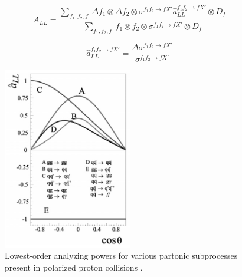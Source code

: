 \begin{equation}
  A_{LL} = \frac{\sum_{f_1,f_2,f}~\Delta f_1 \otimes \Delta f_2 \otimes \sigma^{f_1 f_2 \rightarrow f X'} \hat a_{LL}^{f_1 f_2 \rightarrow f X'} \otimes D_f}{\sum_{f_1,f_2,f}~f_1 \otimes f_2 \otimes \sigma^{f_1 f_2 \rightarrow f X'} \otimes D_f} 
\end{equation}

\begin{equation}
  \hat a_{LL}^{f_1 f_2 \rightarrow f X'} = \frac{\Delta \sigma^{f_1 f_2 \rightarrow f X'}}{\sigma^{f_1 f_2 \rightarrow f X'}}
\end{equation}

\begin{figure}\begin{center}
  \includegraphics[width=0.5\textwidth]{figures/partonic_asymmetry}
  \caption{Lowest-order analyzing powers for various partonic subprocesses present in polarized proton collisions \cite{Bunce:2000uv}.}
\end{center}\end{figure}
